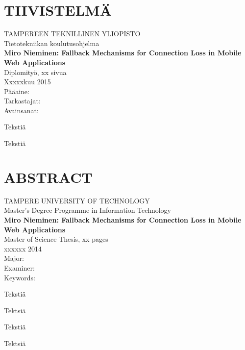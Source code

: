 \newpage
 
\setcounter{page}{1} %
 
\chapter*{TIIVISTELMÄ}
\begin{spacing}{1.0}
\textsf{TAMPEREEN TEKNILLINEN YLIOPISTO}\\
\textsf{Tietotekniikan koulutusohjelma}\\
{\bf \textsf{Miro Nieminen: Fallback Mechanisms for Connection Loss in Mobile Web Applications}}\\
\textsf{Diplomityö, xx sivua}\\
\textsf{Xxxxxkuu 2015}\\
\textsf{Pääaine: }\\
\textsf{Tarkastajat: }\\
\textsf{Avainsanat: }\\
\end{spacing}
 
\noindent
Tekstiä
 
\noindent
Tekstiä

\newpage
\chapter*{ABSTRACT}
\begin{spacing}{1.0}
\textsf{TAMPERE UNIVERSITY OF TECHNOLOGY}\\
\textsf{Master's Degree Programme in Information Technology}\\
{\bf \textsf{Miro Nieminen: Fallback Mechanisms for Connection Loss in Mobile Web Applications}}\\
\textsf{Master of Science Thesis, xx pages}\\
\textsf{xxxxxx 2014}\\
\textsf{Major: }\\
\textsf{Examiner: }\\
\textsf{Keywords: }\\
\end{spacing}
 
\noindent
Tekstiä
 
\noindent
Tektsiä

\noindent
Tekstiä

\noindent
Tektsiä

